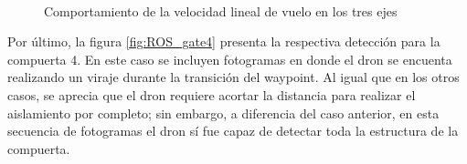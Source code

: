 \begin{figure}[ht]
    \centering
     \hspace{0.2 pt}
     \hspace{0.2 pt}
     \hspace{0.2 pt}
     \\
     \hspace{0.2 pt}
     \hspace{0.2 pt}
     \hspace{0.2 pt}
    
    \caption{Comportamiento de la velocidad lineal de vuelo en los tres ejes}
    \label{fig:ROS_gate3}
\end{figure}

Por último, la figura \ref{fig:ROS_gate4} presenta la respectiva detección para la compuerta 4. En este caso se incluyen fotogramas en donde el dron se encuenta realizando un viraje durante la transición del waypoint. Al igual que en los otros casos, se aprecia que el dron requiere acortar la distancia para realizar el aislamiento por completo; sin embargo, a diferencia del caso anterior, en esta secuencia de fotogramas el dron sí fue capaz de detectar toda la estructura de la compuerta.

